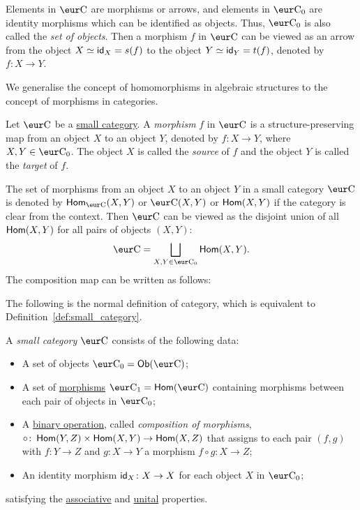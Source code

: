 \begin{remark}
  Elements in $\Ca$ are morphisms or arrows, and elements in $\Ca_0$ are identity morphisms which can be identified as objects. Thus, $\Ca_0$ is also called the \emph{set of objects}. Then a morphism $f$ in $\Ca$ can be viewed as an arrow from the object $X \simeq \operatorname{\text{\normalfont\sffamily id}}_X = s(f)$ to the object $Y \simeq \operatorname{\text{\normalfont\sffamily id}}_Y = t(f)$, denoted by $f \colon X \to Y$.
\end{remark}

We generalise the concept of homomorphisms in algebraic structures to the concept of morphisms in categories.
\begin{definition}[Morphism]\label{def:morphism}
  Let $\Ca$ be a \hyperref[def:small_category]{small category}. A \emph{morphism} $f$ in $\Ca$ is a structure-preserving map from an object $X$ to an object $Y$, denoted by $f \colon X \to Y$, where $X, Y \in \Ca_0$. The object $X$ is called the \emph{source} of $f$ and the object $Y$ is called the \emph{target} of $f$.
\end{definition}

The set of morphisms from an object $X$ to an object $Y$ in a small category $\Ca$ is denoted by $\Hom_{\Ca}(X, Y)$ or $\Ca(X, Y)$ or $\operatorname{\text{\normalfont\sffamily Hom}}(X, Y)$ if the category is clear from the context. Then $\Ca$ can be viewed as the disjoint union of all $\operatorname{\text{\normalfont\sffamily Hom}}(X, Y)$ for all pairs of objects $(X, Y)$:
\[
  \Ca = \bigsqcup_{X, Y \in \Ca_0} \Hom(X, Y).
\]
The composition map can be written as follows:
\begin{center}
\end{center}

The following is the normal definition of category, which is equivalent to Definition~\ref{def:small_category}.
\begin{definition}\label{def:small_category_alternative}
  A \emph{small category} $\Ca$ consists of the following data:
  \begin{itemize}
    \item A set of objects $\Ca_0 = \mathsf{Ob}(\Ca)$;
    \item A set of \hyperref[def:morphism]{morphisms} $\Ca_1 = \Hom(\Ca)$ containing morphisms between each pair of objects in $\Ca_0$;
    \item A \hyperref[def:binary_operation]{binary operation}, called \emph{composition of morphisms}, $\circ \colon \operatorname{\text{\normalfont\sffamily Hom}}(Y, Z) \times \operatorname{\text{\normalfont\sffamily Hom}}(X, Y) \to \operatorname{\text{\normalfont\sffamily Hom}}(X, Z)$ that assigns to each pair $(f, g)$ with $f \colon Y \to Z$ and $g \colon X \to Y$ a morphism $f \circ g \colon X \to Z$;
    \item An identity morphism $\operatorname{\text{\normalfont\sffamily id}}_X \colon X \to X$ for each object $X$ in $\Ca_0$;
  \end{itemize}
  satisfying the \hyperref[def:associative]{associative} and \hyperref[def:unital]{unital} properties.
\end{definition}

